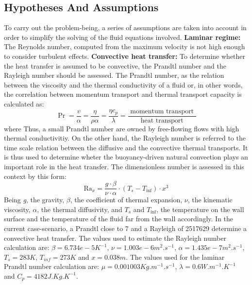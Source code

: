 \subsection{Hypotheses And Assumptions}
To carry out the problem-being, a series of assumptions are taken into account in order to simplify the solving of the fluid equations involved.
\newline
\textbf{Laminar regime:} The Reynolds number, computed from the maximum velocity is not high enough to consider turbulent effects. 
\newline
\textbf{Convective heat transfer:} To determine whether the heat transfer is assumed to be convective, the Prandtl number and the Rayleigh number should be assessed.
\newline
The Prandtl number, as the relation between the viscosity and the thermal conductivity of a fluid or, in other words, the correlation between momentum transport and thermal transport capacity is calculated as:
\begin{equation}
\operatorname{Pr}=\frac{v}{\alpha}=\frac{\eta}{\rho \alpha}=\frac{\eta c_{p}}{\lambda}=\frac{\text { momentum transport }}{\text { heat transport }}
\label{3.3}
\end{equation}
where
Thus, a small Prandtl number are owned by free-flowing flows with high thermal conductivitiy.
\newline
On the other hand, the Rayleigh number is referred to the time scale relation between the diffusive and the convective thermal transports. It is thus used to determine wheter the buoyancy-driven natural convection plays an important role in the heat transfer. The dimensionless number is assessed in this context by this form:
\begin{equation}
\mathrm{Ra}_{x}=\frac{g \cdot \beta}{\nu \cdot \alpha} \cdot\left(T_{s}-T_{\mathrm{inf}}\right) \cdot x^{3}
\label{3.4}
\end{equation}
Being \textit{g}, the gravity, \textit{$\beta$}, the coefficient of thermal expansion, \textit{$\nu$}, the kinematic viscosity, \textit{$\alpha$}, the thermal diffusivity, and \textit{$T_{s}$} and \textit{$T_{\mathrm{inf}}$}, the temperature on the wall surface and the temperature of the fluid far from the wall accordingly.
\newline
In the current case-scenario, a Prandtl close to 7 and a Rayleigh of 2517629 determine a convective heat transfer. The values used to estimate the Rayleigh number calculation are: $\beta = 6.734e-5 K^{-1}$, $\nu = 1.003e-6 m^{2}.s^{-1}$, $\alpha = 1.435e-7 m^{2}.s^{-1}$, $T_{s} = 283 K$, $T_{inf} = 273 K$ and $x = 0.038 m$. The values used for the laminar Prandtl number calculation are: $\mu = 0.001003 Kg.m^{-1}.s^{-1}$, $\lambda = 0.6 W.m^{-1}.K^{-1}$ and $C_{p}=4182 J.Kg.K^{-1}$.
